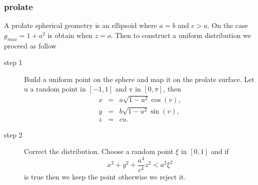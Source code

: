 \documentclass[10pt]{article}
\begin{document}
\subsubsection{prolate}
A prolate spherical geometry is an ellipsoid where $a=b$ and $c>a$. On the case $g_{max}=1+a^2$ is obtain when $z=o$. Then to construct a uniform distribution we proceed as follow
\begin{description}
\item[step 1] Build a uniform point on the sphere and map it on the prolate surface. Let u a random point in $[-1,1]$ and v in $[0,\pi]$, then 
\begin{eqnarray*}
x	&=&	a\sqrt{1-u^2}\cos(v),\\
y	&=&	b\sqrt{1-u^2}\sin(v), \\
z  &=&	c u.
\end{eqnarray*}
\item[step 2] Correct the distribution.  Choose a random point $\xi$ in $[0,1]$ and if 
$$ x^2+y^2 + \frac{a^4}{c^4} z^2 < a^2 \xi^2 $$
is true then we keep the point otherwise we reject it.
\end{description}
\end{document}
